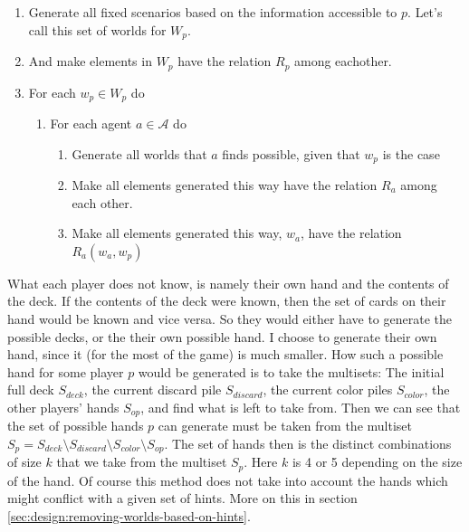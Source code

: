 \begin{enumerate}
	\item Generate all fixed scenarios based on the information accessible to $p$. Let's call this set of worlds for $W_p$. 
	\item And make elements in $W_p$ have the relation $R_p$ among eachother.
	\item For each $w_p \in W_p$ do
		\begin{enumerate}
			\item For each agent $a \in \mathcal{A}$ do
				\begin{enumerate}
				\item Generate all worlds that $a$ finds possible, given that $w_p$ is the case
				\item Make all elements generated this way have the relation $R_a$ among each other.
				\item Make all elements generated this way, $w_a$, have the relation $R_a(w_a,w_p)$
				\end{enumerate}
		\end{enumerate}
\end{enumerate}

What each player does not know, is namely their own hand and the contents of the deck. If the contents of the deck were known, then the set of cards on their hand would be known and vice versa. So they would either have to generate the possible decks, or the their own possible hand. I choose to generate their own hand, since it (for the most of the game) is much smaller.
How such a possible hand for some player $p$ would be generated is to take the multisets: The initial full deck $S_{deck}$, the current discard pile $S_{discard}$, the current color piles $S_{color}$, the other players' hands $S_{op}$, and find what is left to take from. 
 Then we can see that the set of possible hands $p$ can generate must be taken from the multiset $S_p = S_{deck} \setminus S_{discard} \setminus S_{color} \setminus S_{op}$. The set of hands then is the distinct combinations of size $k$ that we take from the multiset $S_p$.
Here $k$ is 4 or 5 depending on the size of the hand.
Of course this method does not take into account the hands which might conflict with a given set of hints. More on this in section \ref{sec:design:removing-worlds-based-on-hints}.




